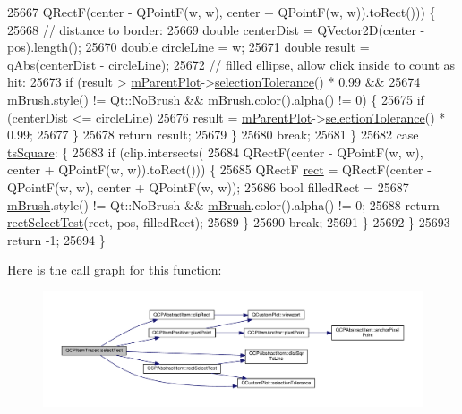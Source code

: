 \begin{DoxyCode}
25667             QRectF(center - QPointF(w, w), center + QPointF(w, w)).toRect())) \{
25668       \textcolor{comment}{// distance to border:}
25669       \textcolor{keywordtype}{double} centerDist = QVector2D(center - pos).length();
25670       \textcolor{keywordtype}{double} circleLine = w;
25671       \textcolor{keywordtype}{double} result = qAbs(centerDist - circleLine);
25672       \textcolor{comment}{// filled ellipse, allow click inside to count as hit:}
25673       \textcolor{keywordflow}{if} (result > \hyperlink{class_q_c_p_layerable_aa2a528433e44db02b8aef23c1f9f90ed}{mParentPlot}->\hyperlink{class_q_custom_plot_a7b738074c75e80070ef6a10263c6cd69}{selectionTolerance}() * 0.99 &&
25674           \hyperlink{class_q_c_p_item_tracer_a6597be63a17a266233941354200b2340}{mBrush}.style() != Qt::NoBrush && \hyperlink{class_q_c_p_item_tracer_a6597be63a17a266233941354200b2340}{mBrush}.color().alpha() != 0) \{
25675         \textcolor{keywordflow}{if} (centerDist <= circleLine)
25676           result = \hyperlink{class_q_c_p_layerable_aa2a528433e44db02b8aef23c1f9f90ed}{mParentPlot}->\hyperlink{class_q_custom_plot_a7b738074c75e80070ef6a10263c6cd69}{selectionTolerance}() * 0.99;
25677       \}
25678       \textcolor{keywordflow}{return} result;
25679     \}
25680     \textcolor{keywordflow}{break};
25681   \}
25682   \textcolor{keywordflow}{case} \hyperlink{class_q_c_p_item_tracer_a2f05ddb13978036f902ca3ab47076500a4ed5f01f2c5fd86d980366d79f481b9b}{tsSquare}: \{
25683     \textcolor{keywordflow}{if} (clip.intersects(
25684             QRectF(center - QPointF(w, w), center + QPointF(w, w)).toRect())) \{
25685       QRectF \hyperlink{_gen_blob_8m_aea8f6815d9a63491fc422c5572c6b3c3}{rect} = QRectF(center - QPointF(w, w), center + QPointF(w, w));
25686       \textcolor{keywordtype}{bool} filledRect =
25687           \hyperlink{class_q_c_p_item_tracer_a6597be63a17a266233941354200b2340}{mBrush}.style() != Qt::NoBrush && \hyperlink{class_q_c_p_item_tracer_a6597be63a17a266233941354200b2340}{mBrush}.color().alpha() != 0;
25688       \textcolor{keywordflow}{return} \hyperlink{class_q_c_p_abstract_item_a4c0e14c4e92df91174cb7183fb363069}{rectSelectTest}(rect, pos, filledRect);
25689     \}
25690     \textcolor{keywordflow}{break};
25691   \}
25692   \}
25693   \textcolor{keywordflow}{return} -1;
25694 \}
\end{DoxyCode}


Here is the call graph for this function\+:\nopagebreak
\begin{figure}[H]
\begin{center}
\leavevmode
\includegraphics[width=350pt]{class_q_c_p_item_tracer_ae71f3728421c83c188c117279ca050fd_cgraph}
\end{center}
\end{figure}


